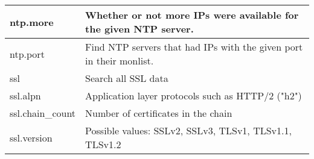\begin{table}[H]
{\begin{tabular}{|l|l|}
ntp.more                                                                        & Whether or not more IPs were available for the given NTP server.                                                                                                                                                                                                                                                                                                            \\ 
\hline
ntp.port                                                                        & Find NTP servers that had IPs with the given port in their monlist.                                                                                                                                                                                                                                                                                                         \\ 
\hline
ssl                                                                             & Search all SSL data                                                                                                                                                                                                                                                                                                                                                         \\ 
\hline
ssl.alpn                                                                        & Application layer protocols such as HTTP/2 ("h2")                                                                                                                                                                                                                                                                                                                           \\ 
\hline
ssl.chain\_count                                                                & Number of certificates in the chain                                                                                                                                                                                                                                                                                                                                         \\ 
\hline
ssl.version                                                                     & Possible values: SSLv2, SSLv3, TLSv1, TLSv1.1, TLSv1.2                                                                                                                                                                                                                                                                                                                      \\ 

\end{tabular}}
\end{table}
